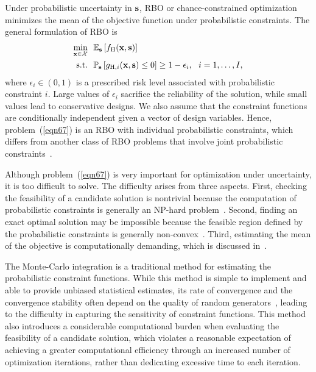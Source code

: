 \documentclass[journal ]{new-aiaa}
\begin{document}
Under probabilistic uncertainty in ${\bf s}$, RBO or chance-constrained optimization~\citep{Campi2011} minimizes the mean of the objective function under probabilistic constraints.
The general formulation of RBO is
\begin{equation}\label{eqn67}
	\begin{aligned}
		\underset{{\bf x} \in \mathcal{X}}{\min} \ \ & \mathbb{E}_{\bf s}\left[f_\text{H}({\bf x},{\bf s})\right]\\
		\textrm{s.t.} \ \ 
		& \mathbb{P}_{\bf s}\left[g_{\text{H},i}({\bf x},{\bf s}) \leq 0\right] \geq 1-\epsilon_i,\ \ i=1,\dots,I, 
	\end{aligned}
\end{equation}
where $\epsilon_i \in (0,1)$ is a prescribed risk level associated with probabilistic constraint $i$.
Large values of $\epsilon_i$ sacrifice the reliability of the solution, while small values lead to conservative designs.
We also assume that the constraint functions are conditionally independent given a vector of design variables.
Hence, problem~(\ref{eqn67}) is an RBO with individual probabilistic constraints, which differs from another class of RBO problems that involve joint probabilistic constraints~\citep{Xie2018}.

Although problem~(\ref{eqn67}) is very important for optimization under uncertainty, it is too difficult to solve. 
The difficulty arises from three aspects.
First, checking the feasibility of a candidate solution is nontrivial because the computation of probabilistic constraints is generally an NP-hard problem~\citep{Geng2019}.
Second, finding an exact optimal solution may be impossible because the feasible region defined by the probabilistic constraints is generally non-convex~\citep{Nemirovski2012}.
Third, estimating the mean of the objective is computationally demanding, which is discussed in~\Cref{Sec631}.

The Monte-Carlo integration is a traditional method for estimating the probabilistic constraint functions.
While this method is simple to implement and able to provide unbiased statistical estimates, its rate of convergence and the convergence stability often depend on the quality of random generators~\citep{Melchers2018}, leading to the difficulty in capturing the sensitivity of constraint functions.
This method also introduces a considerable computational burden when evaluating the feasibility of a candidate solution, which violates a reasonable expectation of achieving a greater computational efficiency through an increased number of optimization iterations, rather than dedicating excessive time to each iteration.
\end{document}
